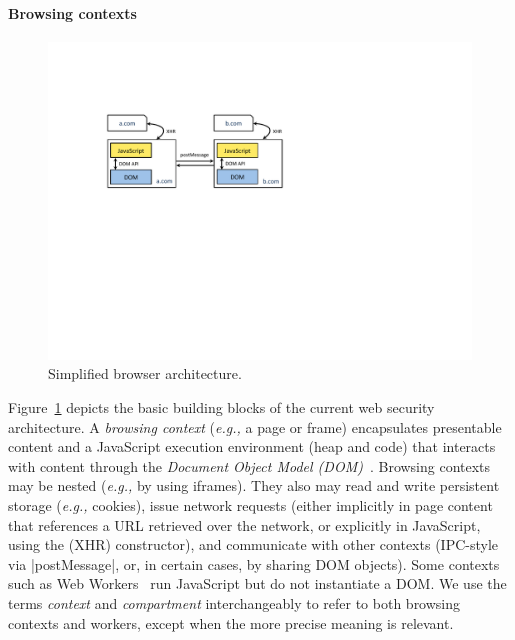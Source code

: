 \paragraph{Browsing contexts}
\begin{figure}
\begin{center}
\includegraphics[width=\columnwidth]{arch.pdf}
\end{center}
\vspace{-10pt}
\caption{\label{fig:primer-browser-arch} Simplified browser
architecture.}
\vspace{-5pt}
\end{figure}
Figure~\ref{fig:primer-browser-arch} depicts the basic building blocks of
the current web security architecture.
%
%
A \emph{browsing context} (\emph{e.g.,} a page or frame) encapsulates
presentable content and a JavaScript execution environment (heap and
code) that interacts with content through the \emph{Document Object
  Model (DOM)}~\cite{html5}.
%
Browsing contexts may be nested (\emph{e.g.,} by using iframes).
%
They also may read and write persistent storage (\emph{e.g.,} cookies), issue
network requests (either implicitly in page content that references a
URL retrieved over the network, or explicitly in JavaScript, using the
\xhr{} (XHR) constructor), and communicate with other contexts
(IPC-style via \js|postMessage|, or, in certain cases, by sharing
DOM objects).
%
Some contexts such as Web Workers~\cite{workers} run JavaScript but do not instantiate a
DOM. We use the terms \emph{context} and \emph{compartment}
interchangeably to refer to both browsing contexts and workers, except when
the more precise meaning is relevant.

